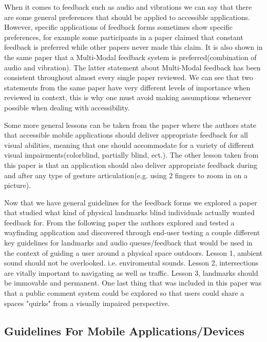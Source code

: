\documentclass{article}
\begin{document}
\par When it comes to feedback such as audio and vibrations we can say that there are some general preferences that should be applied to accessible applications. However, specific applications of feedback forms sometimes show specific preferences, for example some participants in a paper claimed that constant feedback is preferred \cite{RODRIGUEZSANCHEZ20147210} while other papers never made this claim. It is also shown in the same paper that a Multi-Modal feedback system is preferred(combination of audio and vibration). The latter statement about Multi-Modal feedback has been consistent throughout almost every single paper reviewed. We can see that two statements from the same paper have very different levels of importance when reviewed in context, this is why one must avoid making assumptions whenever possible when dealing with accessibility.
\newline
\par Some more general lessons can be taken from the paper \cite{doi:10.1080/10447318.2017.1279827} where the authors state that accessible mobile applications should deliver appropriate feedback for all visual abilities, meaning that one should accommodate for a variety of different visual impairments(colorblind, partially blind, ect.). The other lesson taken from this paper is that an application should also deliver appropriate feedback during and after any type of gesture articulation(e.g. using 2 fingers to zoom in on a picture). 
\newline
\par Now that we have general guidelines for the feedback forms we explored a paper that studied what kind of physical landmarks blind individuals actually wanted feedback for. From the following paper \cite{10.1145/2468356.2468364} the authors explored and tested a wayfinding application and discovered through end-user testing a couple different key guidelines for landmarks and audio queues/feedback that would be used in the context of guiding a user around a physical space outdoors. Lesson 1, ambient sound should not be overlooked. i.e. enviromental sounds. Lesson 2, intersections are vitally important to navigating as well as traffic. Lesson 3, landmarks should be immovable and permanent. One last thing that was included in this paper was that a public comment system could be explored so that users could share a spaces "quirks" from a visually impaired perspective.
\newline


\subsection{Guidelines For Mobile Applications/Devices}
\end{document}
